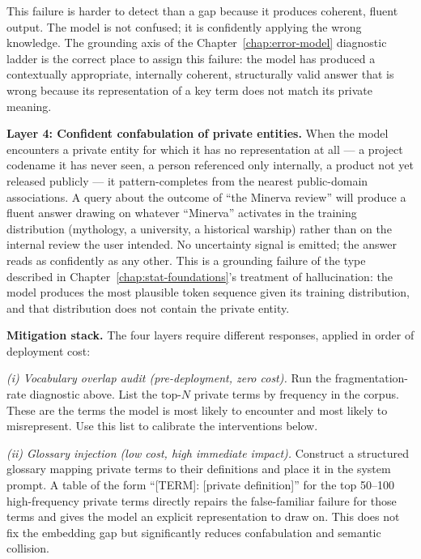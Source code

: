 This failure is harder to detect than a gap because it
produces coherent, fluent output. The model is not confused; it
is confidently applying the wrong knowledge. The grounding axis
of the Chapter~\ref{chap:error-model} diagnostic ladder is the correct place to
assign this failure: the model has produced a contextually
appropriate, internally coherent, structurally valid answer
that is wrong because its representation of a key term does
not match its private meaning.

\textbf{Layer 4: Confident confabulation of private entities.}
When the model encounters a private entity for which it has
no representation at all --- a project codename it has never
seen, a person referenced only internally, a product not yet
released publicly --- it pattern-completes from the nearest
public-domain associations. A query about the outcome of
``the Minerva review'' will produce a fluent answer drawing
on whatever ``Minerva'' activates in the training distribution
(mythology, a university, a historical warship) rather than
on the internal review the user intended. No uncertainty
signal is emitted; the answer reads as confidently as any
other. This is a grounding failure of the type described in
Chapter~\ref{chap:stat-foundations}'s treatment of hallucination: the model produces the
most plausible token sequence given its training distribution,
and that distribution does not contain the private entity.

\textbf{Mitigation stack.} The four layers require different
responses, applied in order of deployment cost:

\emph{(i) Vocabulary overlap audit (pre-deployment, zero cost).}
Run the fragmentation-rate diagnostic above. List the top-$N$
private terms by frequency in the corpus. These are the terms
the model is most likely to encounter and most likely to
misrepresent. Use this list to calibrate the interventions
below.

\emph{(ii) Glossary injection (low cost, high immediate impact).}
Construct a structured glossary mapping private terms to their
definitions and place it in the system prompt. A table of the
form ``[TERM]: [private definition]'' for the top 50--100
high-frequency private terms directly repairs the
false-familiar failure for those terms and gives the model
an explicit representation to draw on. This does not fix the
embedding gap but significantly reduces confabulation and
semantic collision.

